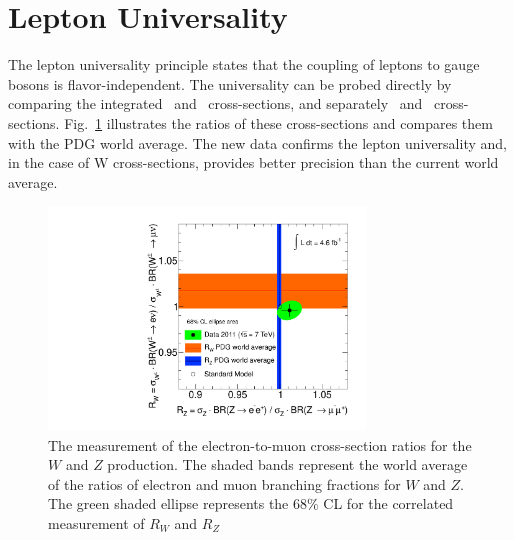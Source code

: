 \clearpage
\section{ Lepton Universality }

The lepton universality principle states that the coupling of leptons to gauge bosons is flavor-independent. The universality can be probed directly by comparing the integrated \Wmn\ and \Wen\ cross-sections, and separately \Zmm\ and \Zee\ cross-sections. Fig.~\ref{Fig:lUniFid} illustrates the ratios of these cross-sections and compares them with the PDG world average. The new data confirms the lepton universality and, in the case of W cross-sections, provides better precision than the current world average.

\begin{figure}
  \begin{center}
    \includegraphics[width=0.75\textwidth]{res/fig/ZWluni_ellipse}
  \end{center}
\caption{The measurement of the electron-to-muon cross-section ratios for the $W$ and $Z$ production.
The shaded bands represent the world average of the ratios of electron and muon branching fractions
for $W$ and $Z$. The green shaded ellipse represents the $68\%$ CL for the correlated measurement of $R_{W}$ and $R_{Z}$}
\label{Fig:lUniFid}
\end{figure}
